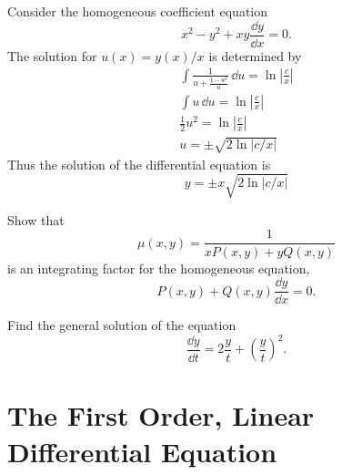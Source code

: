 \begin{Example}
  Consider the homogeneous coefficient equation
  \[
  x^2 - y^2 + x y \frac{\dd y}{\dd x} = 0.
  \]
  The solution for $u(x) = y(x) / x$ is determined by
  \begin{gather*}
    \int \frac{1}{u + \frac{1 - u^2}{u} }\,\dd u = \ln \left| \frac{c}{x} \right| 
    \\
    \int u \,\dd u = \ln \left| \frac{c}{x} \right| 
    \\
    \frac{1}{2} u^2 = \ln \left| \frac{c}{x} \right| 
    \\
    u = \pm \sqrt{2 \ln |c/x|}
  \end{gather*}
  Thus the solution of the differential equation is
  \[
  \boxed{
    y = \pm x \sqrt{2 \ln |c/x|}
    }
  \]
\end{Example}










\begin{Exercise}
  \label{exercise integrating factor homogeneous}
  Show that
  \[
  \mu(x,y) = \frac{1}{x P(x,y) + y Q(x,y)}
  \]
  is an integrating factor for the homogeneous equation,
  \[
  P(x,y) + Q(x,y) \frac{\dd y}{\dd x} = 0.
  \]

\end{Exercise}







\begin{Exercise}
  \label{exercise dydt = f(y/t)}
  Find the general solution of the equation 
  \[
  \frac{\dd y}{\dd t} = 2 \frac{y}{t} + \left( \frac{y}{t} \right)^2.
  \]
  
\end{Exercise}











\section{The First Order, Linear Differential Equation}



